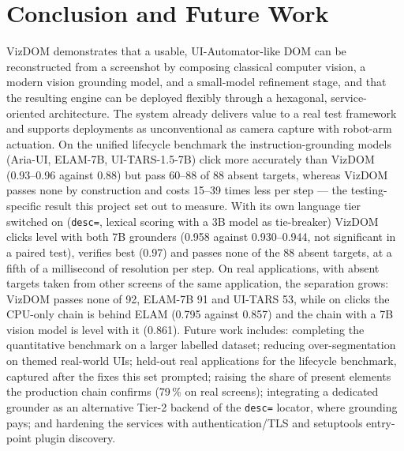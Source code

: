 \documentclass[11pt,a4paper]{article}
\newcommand{\code}[1]{\texttt{#1}}
\begin{document}
\section{Conclusion and Future Work}
VizDOM demonstrates that a usable, UI-Automator-like DOM can be reconstructed from a
screenshot by composing classical computer vision, a modern vision grounding model,
and a small-model refinement stage, and that the resulting engine can be deployed
flexibly through a hexagonal, service-oriented architecture. The system already
delivers value to a real test framework and supports deployments as unconventional
as camera capture with robot-arm actuation. On the unified lifecycle benchmark the
instruction-grounding models (Aria-UI, ELAM-7B, UI-TARS-1.5-7B) click more
accurately than VizDOM (0.93--0.96 against 0.88) but pass 60--88 of 88 absent
targets, whereas VizDOM passes none by construction and costs 15--39 times less per
step --- the testing-specific result this project set out to measure. With its own
language tier switched on (\code{desc=}, lexical scoring with a 3B model as
tie-breaker) VizDOM clicks level with both 7B grounders (0.958 against 0.930--0.944,
not significant in a paired test), verifies best (0.97) and passes none of the 88 absent
targets, at a fifth of a millisecond of resolution per step. On real applications, with
absent targets taken from other screens of the same application, the separation grows:
VizDOM passes none of 92, ELAM-7B 91 and UI-TARS 53, while on clicks the CPU-only chain
is behind ELAM (0.795 against 0.857) and the chain with a 7B vision model is level
with it (0.861). Future work
includes: completing the quantitative benchmark on a larger labelled dataset;
reducing over-segmentation on themed real-world UIs; held-out real applications for the
lifecycle benchmark, captured after the fixes this set prompted; raising the share of
present elements the production chain confirms (79\,\% on real screens); integrating a dedicated grounder as an alternative Tier-2 backend of the
\code{desc=} locator, where grounding pays; and hardening the services with
authentication/TLS and setuptools entry-point plugin discovery.



\end{document}
